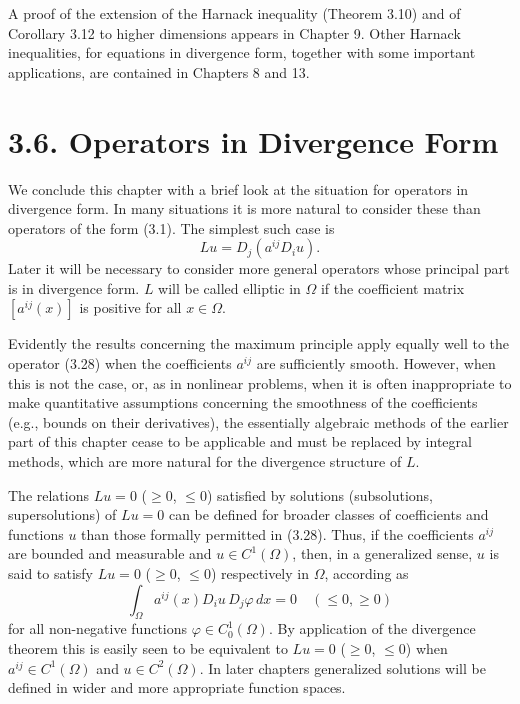 A proof of the extension of the Harnack inequality (Theorem 3.10) and of Corollary 3.12 to higher dimensions appears in Chapter 9. Other Harnack inequalities, for equations in divergence form, together with some important applications, are contained in Chapters 8 and 13.

\section*{3.6. Operators in Divergence Form}

We conclude this chapter with a brief look at the situation for operators in divergence form. In many situations it is more natural to consider these than operators of the form (3.1). The simplest such case is
\[
\tag{3.28}
Lu = D_j(a^{ij}D_i u).
\]
Later it will be necessary to consider more general operators whose principal part is in divergence form. $L$ will be called elliptic in $\Omega$ if the coefficient matrix $[a^{ij}(x)]$ is positive for all $x\in\Omega$.

Evidently the results concerning the maximum principle apply equally well to the operator (3.28) when the coefficients $a^{ij}$ are sufficiently smooth. However, when this is not the case, or, as in nonlinear problems, when it is often inappropriate to make quantitative assumptions concerning the smoothness of the coefficients (e.g., bounds on their derivatives), the essentially algebraic methods of the earlier part of this chapter cease to be applicable and must be replaced by integral methods, which are more natural for the divergence structure of $L$.

The relations $Lu=0$ ($\ge 0$, $\le 0$) satisfied by solutions (subsolutions, supersolutions) of $Lu=0$ can be defined for broader classes of coefficients and functions $u$ than those formally permitted in (3.28). Thus, if the coefficients $a^{ij}$ are bounded and measurable and $u\in C^1(\Omega)$, then, in a generalized sense, $u$ is said to satisfy $Lu=0$ ($\ge 0$, $\le 0$) respectively in $\Omega$, according as
\[
\tag{3.29}
\int_{\Omega} a^{ij}(x)D_i u\,D_j \varphi\,dx = 0\quad (\le 0,\ge 0)
\]
for all non-negative functions $\varphi\in C_0^1(\Omega)$. By application of the divergence theorem this is easily seen to be equivalent to $Lu=0$ ($\ge 0$, $\le 0$) when $a^{ij}\in C^1(\Omega)$ and $u\in C^2(\Omega)$. In later chapters generalized solutions will be defined in wider and more appropriate function spaces.


